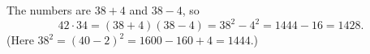 The numbers are $38+4$ and $38-4$, so
\[42\cdot34=(38+4)(38-4)=38^2-4^2=1444-16=\boxed{1428}.\]
(Here $38^2=(40-2)^2=1600-160+4=1444$.)
